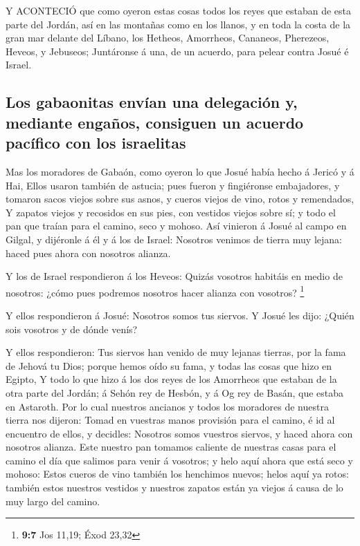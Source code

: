  Y ACONTECIÓ que como oyeron estas cosas todos los reyes que
estaban de esta parte del Jordán, así en las montañas como en los
llanos, y en toda la costa de la gran mar delante del Líbano, los
Hetheos, Amorrheos, Cananeos, Pherezeos, Heveos, y Jebuseos;
 Juntáronse á una, de un acuerdo, para pelear contra Josué é
Israel.

\hypertarget{los-gabaonitas-envuxedan-una-delegaciuxf3n-y-mediante-engauxf1os-consiguen-un-acuerdo-pacuxedfico-con-los-israelitas}{%
\subsection{Los gabaonitas envían una delegación y, mediante engaños,
consiguen un acuerdo pacífico con los
israelitas}\label{los-gabaonitas-envuxedan-una-delegaciuxf3n-y-mediante-engauxf1os-consiguen-un-acuerdo-pacuxedfico-con-los-israelitas}}

 Mas los moradores de Gabaón, como oyeron lo que Josué había
hecho á Jericó y á Hai,  Ellos usaron también de astucia;
pues fueron y fingiéronse embajadores, y tomaron sacos viejos sobre sus
asnos, y cueros viejos de vino, rotos y remendados,  Y
zapatos viejos y recosidos en sus pies, con vestidos viejos sobre sí; y
todo el pan que traían para el camino, seco y mohoso.  Así
vinieron á Josué al campo en Gilgal, y dijéronle á él y á los de Israel:
Nosotros venimos de tierra muy lejana: haced pues ahora con nosotros
alianza.

 Y los de Israel respondieron á los Heveos: Quizás vosotros
habitáis en medio de nosotros: ¿cómo pues podremos nosotros hacer
alianza con vosotros? \footnote{\textbf{9:7} Jos 11,19; Éxod 23,32}

 Y ellos respondieron á Josué: Nosotros somos tus siervos. Y
Josué les dijo: ¿Quién sois vosotros y de dónde venís?

 Y ellos respondieron: Tus siervos han venido de muy lejanas
tierras, por la fama de Jehová tu Dios; porque hemos oído su fama, y
todas las cosas que hizo en Egipto,  Y todo lo que hizo á
los dos reyes de los Amorrheos que estaban de la otra parte del Jordán;
á Sehón rey de Hesbón, y á Og rey de Basán, que estaba en Astaroth.
 Por lo cual nuestros ancianos y todos los moradores de
nuestra tierra nos dijeron: Tomad en vuestras manos provisión para el
camino, é id al encuentro de ellos, y decidles: Nosotros somos vuestros
siervos, y haced ahora con nosotros alianza.  Este nuestro
pan tomamos caliente de nuestras casas para el camino el día que salimos
para venir á vosotros; y helo aquí ahora que está seco y mohoso:
 Estos cueros de vino también los henchimos nuevos; helos
aquí ya rotos: también estos nuestros vestidos y nuestros zapatos están
ya viejos á causa de lo muy largo del camino.


